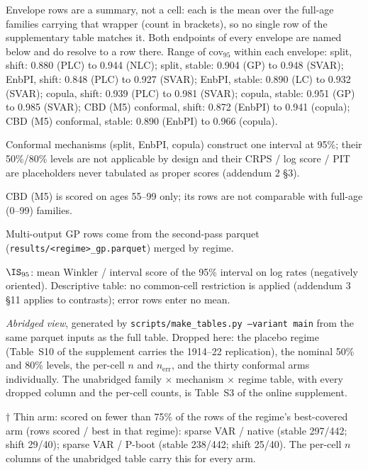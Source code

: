 \begin{table}[tbp]
\begin{threeparttable}
\begin{tablenotes}
\item Envelope rows are a summary, not a cell: each is the mean over the full-age families carrying that wrapper (count in brackets), so no single row of the supplementary table matches it. Both endpoints of every envelope are named below and do resolve to a row there. Range of cov$_{95}$ within each envelope: split, shift: 0.880 (PLC) to 0.944 (NLC); split, stable: 0.904 (GP) to 0.948 (SVAR); EnbPI, shift: 0.848 (PLC) to 0.927 (SVAR); EnbPI, stable: 0.890 (LC) to 0.932 (SVAR); copula, shift: 0.939 (PLC) to 0.981 (SVAR); copula, stable: 0.951 (GP) to 0.985 (SVAR); CBD (M5) conformal, shift: 0.872 (EnbPI) to 0.941 (copula); CBD (M5) conformal, stable: 0.890 (EnbPI) to 0.966 (copula).
\item Conformal mechanisms (split, EnbPI, copula) construct one interval at 95\%; their 50\%/80\% levels are not applicable by design and their CRPS / log score / PIT are placeholders never tabulated as proper scores (addendum 2 \S3).
\item CBD (M5) is scored on ages 55--99 only; its rows are not comparable with full-age (0--99) families.
\item Multi-output GP rows come from the second-pass parquet (\texttt{results/<regime>\_gp.parquet}) merged by regime.
\item $\IS_{95}$: mean Winkler / interval score of the 95\% interval on log rates (negatively oriented). Descriptive table: no common-cell restriction is applied (addendum 3 \S11 applies to contrasts); error rows enter no mean.
\item \emph{Abridged view}, generated by \texttt{scripts/make\_tables.py --variant main} from the same parquet inputs as the full table. Dropped here: the placebo regime (Table~S10 of the supplement carries the 1914--22 replication), the nominal 50\% and 80\% levels, the per-cell $n$ and $n_{\mathrm{err}}$, and the thirty conformal arms individually. The unabridged family $\times$ mechanism $\times$ regime table, with every dropped column and the per-cell counts, is Table~S3 of the online supplement.
\item $\dagger$ Thin arm: scored on fewer than 75\% of the rows of the regime's best-covered arm (rows scored / best in that regime): sparse VAR / native (stable 297/442; shift 29/40); sparse VAR / P-boot (stable 238/442; shift 25/40). The per-cell $n$ columns of the unabridged table carry this for every arm.
\end{tablenotes}
\end{threeparttable}
\end{table}

